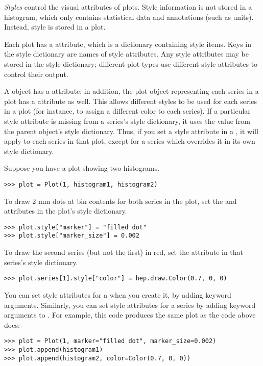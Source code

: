 \textit{Styles} control the visual attributes of plots.  Style
information is not stored in a histogram, which only contains
statistical data and annotations (such as units).  Instead, style is
stored in a plot.

Each plot has a  attribute, which is a dictionary
containing style items.  Keys in the style dictionary are names of style
attributes.  Any style attributes may be stored in the style dictionary;
different plot types use different style attributes to control their
output.

A  object has a  attribute; in addition, the
plot object representing each series in a plot has a 
attribute as well.  This allows different styles to be used for each
series in a plot (for instance, to assign a different color to each
series).  If a particular style attribute is missing from a series's
style dictionary, it uses the value from the parent 
object's style dictionary.  Thus, if you set a style attribute in a
, it will apply to each series in that plot, except for a
series which overrides it in its own style dictionary.

Suppose you have a plot showing two histograms.
\begin{verbatim}
>>> plot = Plot(1, histogram1, histogram2)
\end{verbatim}
To draw 2 mm dots at bin contents for both series in the plot, set the
 and  attributes in the plot's
style dictionary.
\begin{verbatim}
>>> plot.style["marker"] = "filled dot"
>>> plot.style["marker_size"] = 0.002
\end{verbatim}
To draw the second series (but not the first) in red, set the
 attribute in that series's style dictionary.
\begin{verbatim}
>>> plot.series[1].style["color"] = hep.draw.Color(0.7, 0, 0)
\end{verbatim}

You can set style attributes for a  when you create it, by
adding keyword arguments.  Similarly, you can set style attributes for a
series by adding keyword arguments to .  For example,
this code produces the same plot as the code above does:
\begin{verbatim}
>>> plot = Plot(1, marker="filled dot", marker_size=0.002)
>>> plot.append(histogram1)
>>> plot.append(histogram2, color=Color(0.7, 0, 0))
\end{verbatim}

